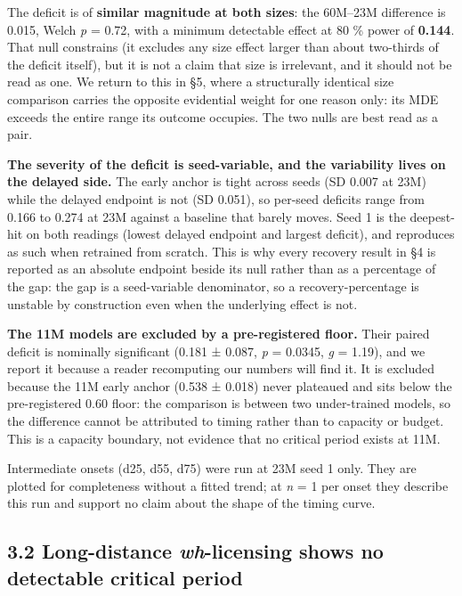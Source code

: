 \documentclass[11pt]{article}
\begin{document}
The deficit is of \textbf{similar magnitude at both sizes}: the 60M--23M difference is 0.015,
Welch \emph{p} = 0.72, with a minimum detectable effect at 80 \% power of \textbf{0.144}. That null
constrains (it excludes any size effect larger than about two-thirds of the deficit itself), but it is not a claim that size is irrelevant, and it should not be read as one. We
return to this in §5, where a structurally identical size comparison carries the opposite
evidential weight for one reason only: its MDE exceeds the entire range its outcome
occupies. The two nulls are best read as a pair.

\textbf{The severity of the deficit is seed-variable, and the variability lives on the delayed
side.} The early anchor is tight across seeds (SD 0.007 at 23M) while the delayed
endpoint is not (SD 0.051), so per-seed deficits range from 0.166 to 0.274 at 23M against a
baseline that barely moves. Seed 1 is the deepest-hit on both readings (lowest delayed
endpoint and largest deficit), and reproduces as such when retrained from scratch. This is
why every recovery result in §4 is reported as an absolute endpoint beside its null rather
than as a percentage of the gap: the gap is a seed-variable denominator, so a
recovery-percentage is unstable by construction even when the underlying effect is not.

\textbf{The 11M models are excluded by a pre-registered floor.} Their paired deficit is
nominally significant (0.181 ± 0.087, \emph{p} = 0.0345, \emph{g} = 1.19), and we report it because a
reader recomputing our numbers will find it. It is excluded because the 11M early anchor
(0.538 ± 0.018) never plateaued and sits below the pre-registered 0.60 floor: the
comparison is between two under-trained models, so the difference cannot be attributed to
timing rather than to capacity or budget. This is a capacity boundary, not evidence that no
critical period exists at 11M.

Intermediate onsets (d25, d55, d75) were run at 23M seed 1 only. They are plotted for
completeness without a fitted trend; at \emph{n} = 1 per onset they describe this run and support
no claim about the shape of the timing curve.

\subsection{\texorpdfstring{3.2 Long-distance \emph{wh}-licensing shows no detectable critical period}{3.2 Long-distance wh-licensing shows no detectable critical period}}\label{long-distance-wh-licensing-shows-no-detectable-critical-period}
\end{document}
